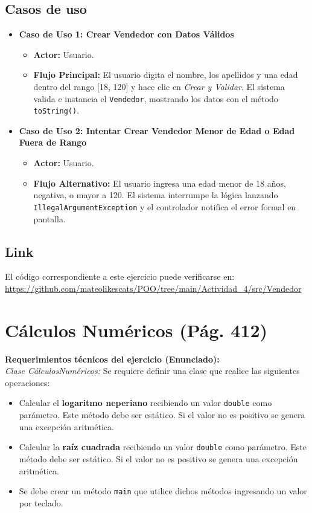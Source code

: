 \documentclass[a4paper,11pt]{article}
\begin{document}
\subsection{Casos de uso}
\begin{itemize}
    \item \textbf{Caso de Uso 1: Crear Vendedor con Datos Válidos}
    \begin{itemize}
        \item \textbf{Actor:} Usuario.
        \item \textbf{Flujo Principal:} El usuario digita el nombre, los apellidos y una edad dentro del rango [18, 120] y hace clic en \textit{Crear y Validar}. El sistema valida e instancia el \texttt{Vendedor}, mostrando los datos con el método \texttt{toString()}.
    \end{itemize}
    \item \textbf{Caso de Uso 2: Intentar Crear Vendedor Menor de Edad o Edad Fuera de Rango}
    \begin{itemize}
        \item \textbf{Actor:} Usuario.
        \item \textbf{Flujo Alternativo:} El usuario ingresa una edad menor de 18 años, negativa, o mayor a 120. El sistema interrumpe la lógica lanzando \texttt{IllegalArgumentException} y el controlador notifica el error formal en pantalla.
    \end{itemize}
\end{itemize}

\subsection{Link}
El código correspondiente a este ejercicio puede verificarse en:
\url{https://github.com/mateolikescats/POO/tree/main/Actividad_4/src/Vendedor}

\newpage

\section{Cálculos Numéricos (Pág. 412)}
\textbf{Requerimientos técnicos del ejercicio (Enunciado):}\\
\textit{Clase CálculosNuméricos:} Se requiere definir una clase que realice las siguientes operaciones:
\begin{itemize}
    \item Calcular el \textbf{logaritmo neperiano} recibiendo un valor \texttt{double} como parámetro. Este método debe ser estático. Si el valor no es positivo se genera una excepción aritmética.
    \item Calcular la \textbf{raíz cuadrada} recibiendo un valor \texttt{double} como parámetro. Este método debe ser estático. Si el valor no es positivo se genera una excepción aritmética.
    \item Se debe crear un método \texttt{main} que utilice dichos métodos ingresando un valor por teclado.
\end{itemize}
\end{document}
